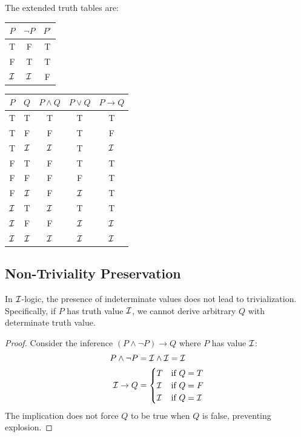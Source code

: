 \begin{definition}
The extended truth tables are:

\begin{center}
\begin{tabular}{c|c|c}
$P$ & $\neg P$ & $P^\circ$ \\
\hline
T & F & T \\
F & T & T \\
$\mathcal{I}$ & $\mathcal{I}$ & F
\end{tabular}
\quad
\begin{tabular}{c|c|c|c|c}
$P$ & $Q$ & $P \land Q$ & $P \lor Q$ & $P \rightarrow Q$ \\
\hline
T & T & T & T & T \\
T & F & F & T & F \\
T & $\mathcal{I}$ & $\mathcal{I}$ & T & $\mathcal{I}$ \\
F & T & F & T & T \\
F & F & F & F & T \\
F & $\mathcal{I}$ & F & $\mathcal{I}$ & T \\
$\mathcal{I}$ & T & $\mathcal{I}$ & T & T \\
$\mathcal{I}$ & F & F & $\mathcal{I}$ & $\mathcal{I}$ \\
$\mathcal{I}$ & $\mathcal{I}$ & $\mathcal{I}$ & $\mathcal{I}$ & $\mathcal{I}$
\end{tabular}
\end{center}
\end{definition}

\subsection{Non-Triviality Preservation}

\begin{theorem}
\label{thm:controlled-indeterminacy}
In $\mathcal{I}$-logic, the presence of indeterminate values does not lead to trivialization. Specifically, if $P$ has truth value $\mathcal{I}$, we cannot derive arbitrary $Q$ with determinate truth value.
\end{theorem}

\begin{proof}
Consider the inference $(P \land \neg P) \rightarrow Q$ where $P$ has value $\mathcal{I}$:
\begin{align*}
    P \land \neg P &= \mathcal{I} \land \mathcal{I} = \mathcal{I} \\
    \mathcal{I} \rightarrow Q &= \begin{cases}
        T & \text{if } Q = T \\
        \mathcal{I} & \text{if } Q = F \\
        \mathcal{I} & \text{if } Q = \mathcal{I}
    \end{cases}
\end{align*}
The implication does not force $Q$ to be true when $Q$ is false, preventing explosion.
\end{proof}

